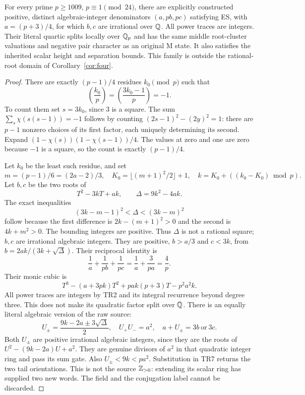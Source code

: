 \begin{theorem}
\label{thm:algebraic}
For every prime $p\ge1009$, $p\equiv1\pmod{24}$, there are explicitly constructed
positive, distinct algebraic-integer denominators $(a,pb,pc)$ satisfying ES,
with $a=(p+3)/4$, for which $b,c$ are irrational over $\mathbb Q$. All power traces
are integers. Their literal quartic splits locally over $\mathbb Q_p$ and has the
same middle root-cluster valuations and negative pair character as an original
M state. It also satisfies the inherited scalar height and separation bounds.
This family is outside the rational-root domain of Corollary~\ref{cor:four}.
\end{theorem}
\begin{proof}
There are exactly $(p-1)/4$ residues $k_0\pmod p$ such that
\[
 \left(\frac{k_0}{p}\right)=
 \left(\frac{3k_0-1}{p}\right)=-1.                     \tag{TR21}
\]
To count them set $s=3k_0$, since $3$ is a square. The sum
$\sum_s\chi(s(s-1))=-1$ follows by counting
$(2s-1)^2-(2y)^2=1$: there are $p-1$ nonzero choices of its first factor,
each uniquely determining its second. Expand
$(1-\chi(s))(1-\chi(s-1))/4$. The values at zero and one are zero because
$-1$ is a square, so the count is exactly $(p-1)/4$.

Let $k_0$ be the least such residue, and set
\[
 m=(p-1)/6=(2a-2)/3,\quad
 K_0=\lfloor(m+1)^2/2\rfloor+1,\quad
 k=K_0+((k_0-K_0)\bmod p).
\]
Let $b,c$ be the two roots of
\[
 T^2-3kT+ak,
 \qquad \Delta=9k^2-4ak.                               \tag{TR22}
\]
The exact inequalities
\[
 \boxed{(3k-m-1)^2<\Delta<(3k-m)^2}                    \tag{TR23}
\]
follow because the first difference is $2k-(m+1)^2>0$ and the second is
$4k+m^2>0$. The bounding integers are positive. Thus $\Delta$ is not a rational
square; $b,c$ are irrational algebraic integers. They are positive,
$b>a/3$ and $c<3k$, from $b=2ak/(3k+\sqrt\Delta)$.
Their reciprocal identity is
\[
 \frac1a+\frac1{pb}+\frac1{pc}
 =\frac1a+\frac3{pa}=\frac4p.
\]
Their monic cubic is
\[
 T^3-(a+3pk)T^2+pa k(p+3)T-p^2a^2k.                   \tag{TR24}
\]
All power traces are integers by TR2 and its integral recurrence beyond degree
three. This does not make its quadratic factor split over $\mathbb Q$.
There is an equally literal algebraic version of the raw source:
\[
 U_\pm=\frac{9k-2a\pm3\sqrt\Delta}{2},\quad
 U_+U_-=a^2,\quad a+U_\pm=3b\ \text{or}\ 3c.            \tag{TR25}
\]
Both $U_\pm$ are positive irrational algebraic integers, since they are the roots
of $U^2-(9k-2a)U+a^2$. They are genuine divisors of $a^2$ in that quadratic
integer ring and pass its sum gate. Also
$U_\pm<9k<p a^2$. Substitution in TR7 returns the two tail orientations.
This is not the source $\mathbb Z_{>0}$: extending its scalar ring has supplied two
new words. The field and the conjugation label cannot be discarded.


\end{proof}

